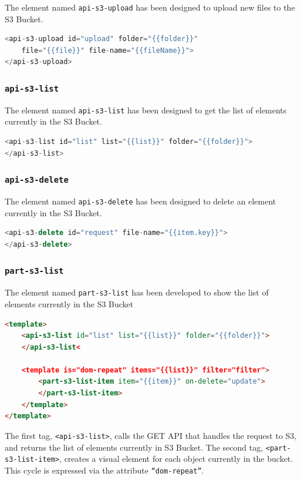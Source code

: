 The element named \texttt{api-s3-upload} has been designed to upload new files to the S3 Bucket.
\begin{lstlisting}[language=javascript]
<api-s3-upload id="upload" folder="{{folder}}"
	file="{{file}}" file-name="{{fileName}}">
</api-s3-upload>
\end{lstlisting}


\subsubsection{\texttt{api-s3-list}}
\label{api-s3-list}
The element named \texttt{api-s3-list} has been designed to get the list of elements currently in the S3 Bucket.
\begin{lstlisting}[language=javascript]
<api-s3-list id="list" list="{{list}}" folder="{{folder}}">
</api-s3-list>
\end{lstlisting}


\subsubsection{\texttt{api-s3-delete}}
\label{api-s3-delete}
The element named \texttt{api-s3-delete} has been designed to delete an element currently in the S3 Bucket.
\begin{lstlisting}[language=javascript]
<api-s3-delete id="request" file-name="{{item.key}}">
</api-s3-delete>
\end{lstlisting}


\subsubsection{\texttt{part-s3-list}}
\label{part-s3-list}
The element named \texttt{part-s3-list} has been developed to show the list of elements currently in the S3 Bucket
\begin{lstlisting}[language=html]
<template>
    <api-s3-list id="list" list="{{list}}" folder="{{folder}}">
    </api-s3-list<

    <template is="dom-repeat" items="{{list}}" filter="filter">
        <part-s3-list-item item="{{item}}" on-delete="update">
        </part-s3-list-item>
    </template>
</template>
\end{lstlisting}
The first tag, \texttt{<api-s3-list>}, calls the GET API that handles the request to S3, and returns the list of elements currently in S3 Bucket.
The second tag, \texttt{<part-s3-list-item>}, creates a visual element for each object currently in the bucket. This cycle is expressed via the attribute \texttt{``dom-repeat''}.


